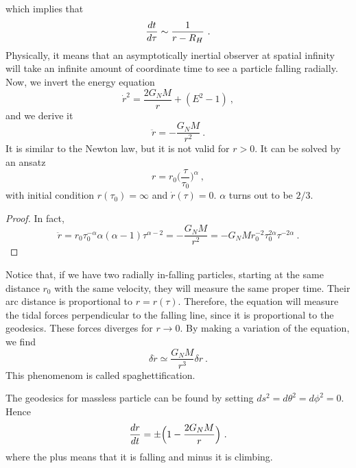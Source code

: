     which implies that 
    \begin{equation*}
        \frac{dt}{d\tau} \sim \frac{1}{r - R_H} ~.
    \end{equation*}
    Physically, it means that an asymptotically inertial observer at spatial infinity will take an infinite amount of coordinate time to see a particle falling radially. Now, we invert the energy equation  
    \begin{equation*}
        \dot r^2 = \frac{2G_N M}{r} + (E^2 - 1) ~,
    \end{equation*}
    and we derive it 
    \begin{equation*}
        \ddot r = - \frac{G_N M}{r^2} ~.
    \end{equation*}
    It is similar to the Newton law, but it is not valid for $r > 0$. It can be solved by an ansatz
    \begin{equation*}
        r = r_0 \Big (\frac{\tau}{\tau_0} \Big )^\alpha ~,
    \end{equation*}
    with initial condition $r(\tau_0) = \infty$ and $\dot r(\tau) = 0$. $\alpha$ turns out to be $2/3$.
    \begin{proof}
        In fact, 
        \begin{equation*}
            \ddot r = r_0 \tau_0^{-\alpha} \alpha (\alpha-1) \tau^{\alpha - 2} = - \frac{G_N M}{r^2} = - G_N M r_0^{-2} \tau^{2\alpha}_0 \tau^{-2\alpha} ~.
        \end{equation*}
    \end{proof}
    Notice that, if we have two radially in-falling particles, starting at the same distance $r_0$ with the same velocity, they will measure the same proper time. Their arc distance is proportional to $r=r(\tau)$. Therefore, the equation will measure the tidal forces perpendicular to the falling line, since it is proportional to the geodesics. These forces diverges for $r \rightarrow 0$. By making a variation of the equation, we find 
    \begin{equation*}
        \delta \ddot r \simeq \frac{G_N M}{r^3} \delta r ~.
    \end{equation*}
    This phenomenom is called spaghettification. 

    The geodesics for massless particle can be found by setting $ds^2 = d\theta^2 = d\phi^2 = 0$. Hence 
    \begin{equation*}
        \frac{dr}{dt} = \pm \Big (1 - \frac{2 G_N M}{r} \Big) ~.
    \end{equation*}
    where the plus means that it is falling and minus it is climbing.

